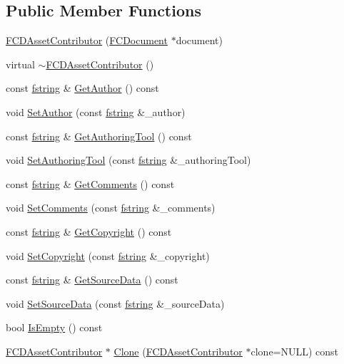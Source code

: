 \subsection*{Public Member Functions}
\begin{DoxyCompactItemize}
\item 
\hyperlink{classFCDAssetContributor_a8a7123eb16366bac47bf3708970556f7}{FCDAssetContributor} (\hyperlink{classFCDocument}{FCDocument} $\ast$document)
\item 
virtual \hyperlink{classFCDAssetContributor_a6590d01617a5c6ad85d08a1325973a9a}{$\sim$FCDAssetContributor} ()
\item 
const \hyperlink{classfm_1_1stringT}{fstring} \& \hyperlink{classFCDAssetContributor_abd825a17c602412292656fe8d52680c5}{GetAuthor} () const 
\item 
void \hyperlink{classFCDAssetContributor_abc74516d6102c6322c43f2577da8c81a}{SetAuthor} (const \hyperlink{classfm_1_1stringT}{fstring} \&\_\-author)
\item 
const \hyperlink{classfm_1_1stringT}{fstring} \& \hyperlink{classFCDAssetContributor_a9ddb47c979cc5b8ad97e8dd7d897e897}{GetAuthoringTool} () const 
\item 
void \hyperlink{classFCDAssetContributor_a07a2dd49a8ccf12e5870fa06b7a61f02}{SetAuthoringTool} (const \hyperlink{classfm_1_1stringT}{fstring} \&\_\-authoringTool)
\item 
const \hyperlink{classfm_1_1stringT}{fstring} \& \hyperlink{classFCDAssetContributor_a69f3f0685703c61cfcabd362eca31a33}{GetComments} () const 
\item 
void \hyperlink{classFCDAssetContributor_acaa614aecc59641c5e15add26922e861}{SetComments} (const \hyperlink{classfm_1_1stringT}{fstring} \&\_\-comments)
\item 
const \hyperlink{classfm_1_1stringT}{fstring} \& \hyperlink{classFCDAssetContributor_a58f5cc84befb00e73f941821e257211b}{GetCopyright} () const 
\item 
void \hyperlink{classFCDAssetContributor_a9cb9b88bde5c78bda46283253e24ea17}{SetCopyright} (const \hyperlink{classfm_1_1stringT}{fstring} \&\_\-copyright)
\item 
const \hyperlink{classfm_1_1stringT}{fstring} \& \hyperlink{classFCDAssetContributor_a12e695e3b5a4eeced536aae16d5a7e2b}{GetSourceData} () const 
\item 
void \hyperlink{classFCDAssetContributor_abc3ff900877819ed4ffd2681d7fa5429}{SetSourceData} (const \hyperlink{classfm_1_1stringT}{fstring} \&\_\-sourceData)
\item 
bool \hyperlink{classFCDAssetContributor_aed4c3b91ce010f2a1a90a4a4896f901f}{IsEmpty} () const 
\item 
\hyperlink{classFCDAssetContributor}{FCDAssetContributor} $\ast$ \hyperlink{classFCDAssetContributor_ab6a0451d9febd1426b861846ad21dffd}{Clone} (\hyperlink{classFCDAssetContributor}{FCDAssetContributor} $\ast$clone=NULL) const 
\end{DoxyCompactItemize}



